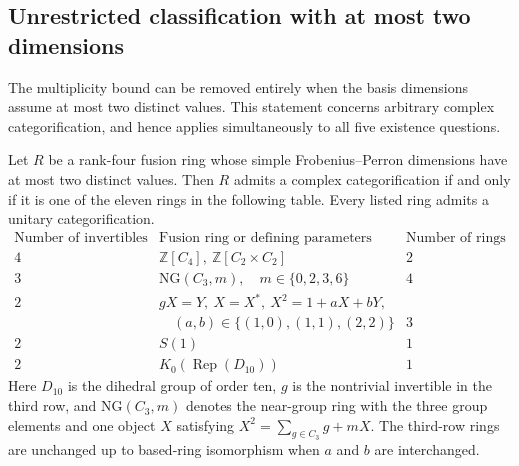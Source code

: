 \subsection{Unrestricted classification with at most two dimensions}
\label{sec:unbounded-two-dimensions}
The multiplicity bound can be removed entirely when the basis dimensions
assume at most two distinct values. This statement concerns arbitrary
complex categorification, and hence applies simultaneously to all five
existence questions.

\begin{theorem}\label{thm:two-dimensions-unbounded}
Let $R$ be a rank-four fusion ring whose simple Frobenius--Perron dimensions
have at most two distinct values. Then $R$ admits a complex categorification
if and only if it is one of the eleven rings in the following table. Every
listed ring admits a unitary categorification.
\[
\begin{array}{c|l|c}
\text{Number of invertibles}&\text{Fusion ring or defining parameters}
 &\text{Number of rings}\\\hline
4&\mathbb Z[C_4],\ \mathbb Z[C_2\times C_2]&2\\
3&\mathrm{NG}(C_3,m),\quad m\in\{0,2,3,6\}&4\\
2&gX=Y,\ X=X^*,\ X^2=1+aX+bY,\\[-3pt]
 &\hspace{1em}(a,b)\in\{(1,0),(1,1),(2,2)\}&3\\
2&S(1)&1\\
2&K_0(\operatorname{Rep}(D_{10}))&1
\end{array}
\]
Here $D_{10}$ is the dihedral group of order ten, $g$ is the nontrivial
invertible in the third row, and $\mathrm{NG}(C_3,m)$ denotes the near-group
ring with the three group elements and one object $X$ satisfying
$X^2=\sum_{g\in C_3}g+mX$. The third-row rings are unchanged up to based-ring
isomorphism when $a$ and $b$ are interchanged.
\end{theorem}
